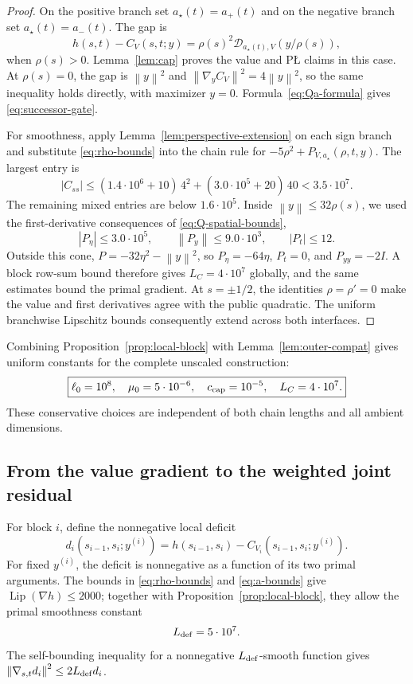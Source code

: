 \documentclass[11pt,a4paper]{article}
\newcommand{\norm}[1]{\left\lVert #1\right\rVert}
\newcommand{\Lip}{\operatorname{Lip}}
\theoremstyle{definition}
\theoremstyle{remark}
\numberwithin{equation}{section}
\begin{document}
\begin{proof}
On the positive branch set $a_\star(t)=a_+(t)$ and on the negative branch set $a_\star(t)=a_-(t)$.  The gap is
\[
 h(s,t)-C_V(s,t;y)
 =\rho(s)^2\mathscr D_{a_\star(t),V}(y/\rho(s)),
\]
when $\rho(s)>0$. Lemma~\ref{lem:cap} proves the value and P\L{}
claims in this case. At $\rho(s)=0$, the gap is $\norm y^2$ and
$\norm{\nabla_yC_V}^2=4\norm y^2$, so the same inequality holds
directly, with maximizer $y=0$. Formula~\eqref{eq:Qa-formula} gives
\eqref{eq:successor-gate}.

For smoothness, apply Lemma~\ref{lem:perspective-extension} on each sign branch and substitute \eqref{eq:rho-bounds} into the chain rule for
$-5\rho^2+P_{V,a_\star}(\rho,t,y)$.  The largest entry is
\[
 |C_{ss}|
 \le(1.4\cdot10^6+10)\,4^2
 +(3.0\cdot10^5+20)\,40
 <3.5\cdot10^7.
\]
The remaining mixed entries are below $1.6\cdot10^5$.  Inside $\norm y\le32\rho(s)$, we used the first-derivative consequences of \eqref{eq:Q-spatial-bounds},
\[
 |P_\eta|\le3.0\cdot10^5,
 \qquad
 \norm{P_y}\le9.0\cdot10^3,
 \qquad
 |P_t|\le12.
\]
Outside this cone, $P=-32\eta^2-\norm y^2$, so
$P_\eta=-64\eta$, $P_t=0$, and $P_{yy}=-2I$. A block row-sum bound
therefore gives $L_C=4\cdot10^7$ globally, and the same estimates bound
the primal gradient. At $s=\pm1/2$, the identities $\rho=\rho'=0$
make the value and first derivatives agree with the public quadratic.
The uniform branchwise Lipschitz bounds consequently extend across
both interfaces.
\end{proof}

Combining Proposition~\ref{prop:local-block} with Lemma~\ref{lem:outer-compat} gives uniform constants for the complete unscaled construction:
\begin{equation}
 \boxed{
 \ell_0=10^8,
 \quad \mu_0=5\cdot10^{-6},
 \quad c_{\rm cap}=10^{-5},
 \quad L_C=4\cdot10^7.
 }
 \label{eq:common-ledger}
\end{equation}
These conservative choices are independent of both chain lengths and all ambient dimensions.

\subsection{From the value gradient to the weighted joint residual}
\label{sec:transfer}

For block $i$, define the nonnegative local deficit
\[
 d_i(s_{i-1},s_i;y^{(i)})
 =h(s_{i-1},s_i)-C_{V_i}(s_{i-1},s_i;y^{(i)}).
\]
For fixed $y^{(i)}$, the deficit is nonnegative as a function of its
two primal arguments. The bounds in \eqref{eq:rho-bounds} and
\eqref{eq:a-bounds} give $\Lip(\nabla h)\le2000$; together with
Proposition~\ref{prop:local-block}, they allow the primal smoothness
constant
\begin{equation}
 L_{\rm def}=5\cdot10^7.
 \label{eq:Ldef}
\end{equation}
The self-bounding inequality for a nonnegative $L_{\rm def}$-smooth function gives
$\norm{\nabla_{s,t}d_i}^2\le2L_{\rm def}d_i$.
\end{document}
